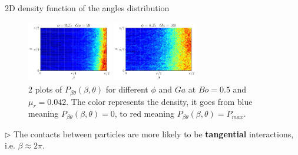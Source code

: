 \documentclass{sintefbeamer}
\begin{document}
\begin{frame}{2D density function of the angles distribution}  
\begin{figure}[h!]
    \centering
    
    \includegraphics[width = 0.33\textwidth]{image/N_10/beta/2DMAP_beta_theta_dmin_10_Bo0_5PHI0_25mu_r0_042Ga10.pdf}
   \includegraphics[width = 0.33\textwidth]{image/N_10/beta/2DMAP_beta_theta_dmin_10_Bo0_5PHI0_25mu_r0_042Ga100.pdf}
    \caption{2 plots of $P_{\beta\theta}(\beta,\theta)$ for different $\phi$ and $Ga$ at $Bo = 0.5$ and $\mu_r = 0.042$. The color represents the density, it goes from blue meaning $P_{\beta\theta}(\beta,\theta)= 0$, to red meaning $P_{\beta\theta}(\beta,\theta) = P_{max}$.}

\end{figure} 

$\triangleright$ The contacts between particles are more likely to be \textbf{tangential} interactions, i.e. $\beta \approx 2\pi$. 

\end{frame}
\end{document}
